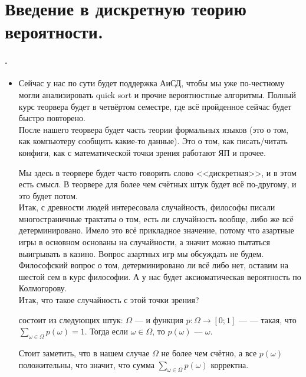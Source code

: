 \documentclass{article}
\begin{document}
    \section{Введение в дискретную теорию вероятности.}
    \paragraph{.}
    \begin{itemize}
        \item[]
        \begin{Comment}
            Сейчас у нас по сути будет поддержка АиСД, чтобы мы уже по-честному могли анализировать quick sort и прочие вероятностные алгоритмы. Полный курс теорвера будет в четвёртом семестре, где всё пройденное сейчас будет быстро повторено.\\
            После нашего теорвера будет часть теории формальных языков (это о том, как компьютеру сообщить какие-то данные). Это о том, как писать/читать конфиги, как с математической точки зрения работают ЯП и прочее.
        \end{Comment}
        \begin{Comment}
            Мы здесь в теорвере будет часто говорить слово <<дискретная>>, и в этом есть смысл. В теорвере для более чем счётных штук будет всё по-другому, и это будет потом.\\
            Итак, с древности людей интересовала случайность, философы писали многостраничные трактаты о том, есть ли случайность вообще, либо же всё детерминировано. Имело это всё прикладное значение, потому что азартные игры в основном основаны на случайности, а значит можно пытаться выигрывать в казино. Вопрос азартных игр мы обсуждать не будем. Философский вопрос о том, детерминировано ли всё либо нет, оставим на шестой сем в курс философии. А у нас будет аксиоматическая вероятность по Колмогорову.\\
            Итак, что такое случайность с этой точки зрения?
        \end{Comment}
        \dfn {} состоит из следующих штук: $\Omega$ ---  и функция $p\colon\Omega\to[0;1]$ ---  --- такая, что $\sum\limits_{\omega\in\Omega}p(\omega)=1$. Тогда если $\omega\in\Omega$, то $p(\omega)$ ---  $\omega$.
        \begin{Comment}
            Стоит заметить, что в нашем случае $\Omega$ не более чем счётно, а все $p(\omega)$ положительны, что значит, что сумма $\sum\limits_{\omega\in\Omega}p(\omega)$ корректна.

\end{Comment}
\end{itemize}
\end{document}
